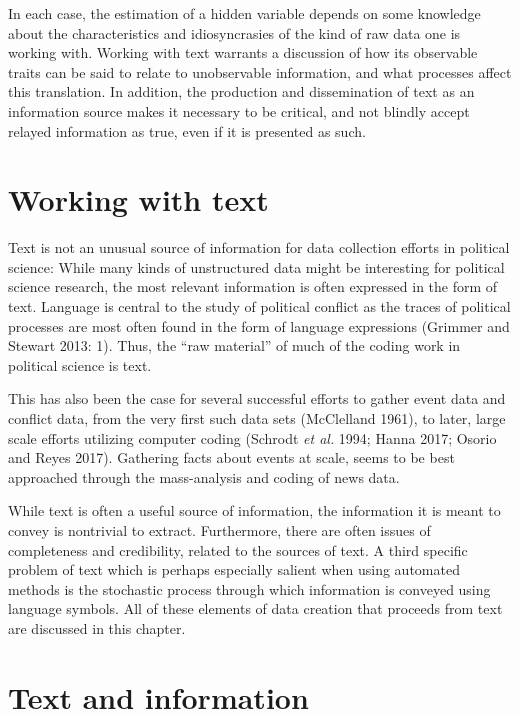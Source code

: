 \documentclass[12pt,twoside]{reedthesis}
\begin{document}
In each case, the estimation of a hidden variable depends on some
knowledge about the characteristics and idiosyncrasies of the kind of
raw data one is working with. Working with text warrants a discussion of
how its observable traits can be said to relate to unobservable
information, and what processes affect this translation. In addition,
the production and dissemination of text as an information source makes
it necessary to be critical, and not blindly accept relayed information
as true, even if it is presented as such.

\section{Working with text}\label{working-with-text}

Text is not an unusual source of information for data collection efforts
in political science: While many kinds of unstructured data might be
interesting for political science research, the most relevant
information is often expressed in the form of text. Language is central
to the study of political conflict as the traces of political processes
are most often found in the form of language expressions (Grimmer and
Stewart 2013: 1). Thus, the ``raw material'' of much of the coding work
in political science is text.

This has also been the case for several successful efforts to gather
event data and conflict data, from the very first such data sets
(McClelland 1961), to later, large scale efforts utilizing computer
coding (Schrodt \emph{et al.} 1994; Hanna 2017; Osorio and Reyes 2017).
Gathering facts about events at scale, seems to be best approached
through the mass-analysis and coding of news data.

While text is often a useful source of information, the information it
is meant to convey is nontrivial to extract. Furthermore, there are
often issues of completeness and credibility, related to the sources of
text. A third specific problem of text which is perhaps especially
salient when using automated methods is the stochastic process through
which information is conveyed using language symbols. All of these
elements of data creation that proceeds from text are discussed in this
chapter.

\section{Text and information}\label{text-and-information}
\end{document}
